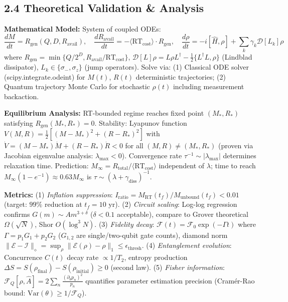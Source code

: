 \documentclass[a4paper,10pt,twoside]{article}
\begin{document}
\vspace{-4pt}
\subsection*{2.4 Theoretical Validation \& Analysis}
\vspace{-4pt}

\textbf{Mathematical Model:} System of coupled ODEs:
\vspace{-4pt}
\[
\frac{dM}{dt} = R_{\text{gen}}(Q, D, R_{\text{avail}}), \quad \frac{dR_{\text{avail}}}{dt} = -\langle\text{RT}_{\text{cost}}\rangle \cdot R_{\text{gen}}, \quad \frac{d\rho}{dt} = -i[\hat{H}, \rho] + \sum_k \gamma_k \mathcal{D}[L_k]\rho
\]
\vspace{-6pt}
where $R_{\text{gen}} = \min\{Q/2^D, R_{\text{avail}}/\text{RT}_{\text{cost}}\}$, $\mathcal{D}[L]\rho = L\rho L^\dagger - \frac{1}{2}\{L^\dagger L, \rho\}$ (Lindblad dissipator), $L_k \in \{\sigma_-, \sigma_z\}$ (jump operators). Solve via: (1) Classical ODE solver (scipy.integrate.odeint) for $M(t)$, $R(t)$ deterministic trajectories; (2) Quantum trajectory Monte Carlo for stochastic $\rho(t)$ including measurement backaction.

\textbf{Equilibrium Analysis:} RT-bounded regime reaches fixed point $(M_*, R_*)$ satisfying $R_{\text{gen}}(M_*, R_*) = 0$. Stability: Lyapunov function $V(M,R) = \frac{1}{2}[(M-M_*)^2 + (R-R_*)^2]$ with $\dot{V} = (M-M_*)\dot{M} + (R-R_*)\dot{R} < 0$ for all $(M,R) \neq (M_*,R_*)$ (proven via Jacobian eigenvalue analysis: $\lambda_{\text{max}} < 0$). Convergence rate $\tau^{-1} \sim |\lambda_{\text{max}}|$ determines relaxation time. Prediction: $M_{\infty} = R_{\text{total}}/\langle\text{RT}_{\text{cost}}\rangle$ independent of $\lambda$; time to reach $M_{\infty}(1-e^{-1}) \approx 0.63M_{\infty}$ is $\tau \sim (\lambda + \gamma_{\text{diss}})^{-1}$.

\textbf{Metrics:} (1) \textit{Inflation suppression}: $I_{\text{ratio}} = M_{\text{RT}}(t_f)/M_{\text{unbound}}(t_f) < 0.01$ (target: $99\%$ reduction at $t_f = 10$ yr). (2) \textit{Circuit scaling}: Log-log regression confirms $G(m) \sim Am^{3+\delta}$ ($\delta < 0.1$ acceptable), compare to Grover theoretical $\Omega(\sqrt{N})$, Shor $O(\log^3 N)$. (3) \textit{Fidelity decay}: $\mathcal{F}(t) = \mathcal{F}_0 \exp(-\Gamma t)$ where $\Gamma = p_1 G_1 + p_2 G_2$ ($G_{1,2}$ are single/two-qubit gate counts), diamond norm $\|\mathcal{E} - \mathcal{I}\|_\diamond = \sup_{\rho}\|\mathcal{E}(\rho) - \rho\|_1 \leq \epsilon_{\text{thresh}}$. (4) \textit{Entanglement evolution}: Concurrence $C(t)$ decay rate $\propto 1/T_2$, entropy production $\Delta S = S(\rho_{\text{final}}) - S(\rho_{\text{initial}}) \geq 0$ (second law). (5) \textit{Fisher information}: $\mathcal{F}_Q[\rho,\hat{A}] = 2\sum_n \frac{(\partial_\theta p_n)^2}{p_n}$ quantifies parameter estimation precision (Cramér-Rao bound: $\text{Var}(\theta) \geq 1/\mathcal{F}_Q$).
\end{document}
